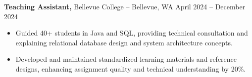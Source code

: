 \documentclass[11pt]{article}       %
\begin{document}
\textbf{Teaching Assistant,} {Bellevue College} -- Bellevue, WA \hfill April 2024 -- December 2024 \\
\vspace{-9pt}
\begin{itemize}
  \item Guided 40+ students in Java and SQL, providing technical consultation and explaining relational database design and system architecture concepts.
  \item Developed and maintained standardized learning materials and reference designs, enhancing assignment quality and technical understanding by 20\%.
\end{itemize}

\end{document}
